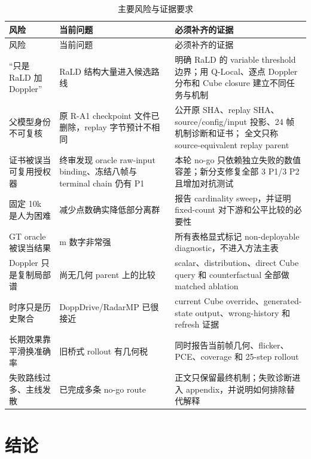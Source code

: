 \documentclass[11pt,a4paper,fontset=none]{ctexart}
\begin{document}
\begin{longtable}{>{\raggedright\arraybackslash}p{3.5cm} >{\raggedright\arraybackslash}p{5.1cm} >{\raggedright\arraybackslash}p{5.8cm}}
\caption{主要风险与证据要求}\\
\toprule
风险 & 当前问题 & 必须补齐的证据 \\
\midrule
\endfirsthead
\toprule
风险 & 当前问题 & 必须补齐的证据 \\
\midrule
\endhead
“只是 RaLD 加 Doppler” &
RaLD 结构大量进入候选路线 &
明确 RaLD 的 variable threshold 边界；用 Q-Local、逐点 Doppler 分布和 Cube closure
建立不同任务与机制 \\

父模型身份不可复核 &
原 R-A1 checkpoint 文件已删除，replay 字节预计不相同 &
公开原 SHA、replay SHA、source/config/input 投影、24 帧机制诊断和证书；
全文只称 source-equivalent replay parent \\

证书被误当可复用授权器 &
终审发现 oracle raw-input binding、冻结八帧与 terminal chain 仍有 P1 &
本轮 no-go 只依赖独立失败的数值容差；新分支修复全部 3 P1/3 P2 且增加对抗测试 \\

固定 10k 是人为困难 &
减少点数确实降低部分离群 &
报告 cardinality sweep，并证明 fixed-count 对下游和公平比较的必要性 \\

GT oracle 被误当结果 &
0.641 m 数字非常强 &
所有表格显式标记 non-deployable diagnostic，不进入方法主表 \\

Doppler 只是复制局部谱 &
尚无几何 parent 上的比较 &
scalar、distribution、direct Cube query 和 counterfactual 全部做 matched ablation \\

时序只是历史聚合 &
DoppDrive/RadarMP 已很接近 &
current Cube override、generated-state output、wrong-history 和 refresh 证据 \\

长期效果靠平滑换准确率 &
旧桥式 rollout 有几何税 &
同时报告当前帧几何、flicker、PCE、coverage 和 25-step rollout \\

失败路线过多、主线发散 &
已完成多条 no-go route &
正文只保留最终机制；失败诊断进入 appendix，并说明如何排除替代解释 \\
\bottomrule
\end{longtable}

\section{结论}
\end{document}
